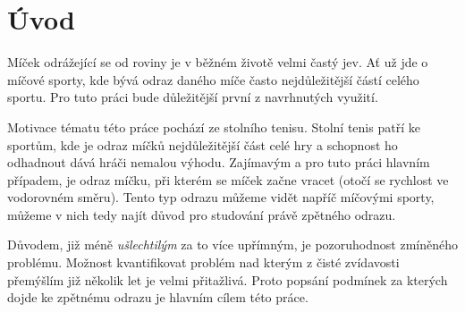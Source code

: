 \chapter*{Úvod}

Míček odrážející se od roviny je v běžném životě velmi častý jev. Ať už jde o
míčové sporty, kde bývá odraz daného míče často nejdůležitější částí celého
sportu. Pro tuto práci bude důležitější první z navrhnutých
využití. 

Motivace tématu této práce pochází ze stolního tenisu. Stolní tenis patří ke
sportům, kde je odraz míčků nejdůležitější část celé hry a schopnost ho
odhadnout dává hráči nemalou výhodu. Zajímavým a pro tuto práci hlavním
případem, je odraz míčku, při kterém se míček začne vracet (otočí se rychlost ve
vodorovném směru). Tento typ odrazu můžeme vidět napříč míčovými sporty, můžeme
v nich tedy najít důvod pro studování právě zpětného odrazu. 

Důvodem, již méně \emph{ušlechtilým} za to více upřímným, je pozoruhodnost
zmíněného problému. Možnost kvantifikovat problém nad kterým z čisté zvídavosti
přemýšlím již několik let je velmi přitažlivá. Proto popsání podmínek za
kterých dojde ke zpětnému odrazu je hlavním cílem této práce.
